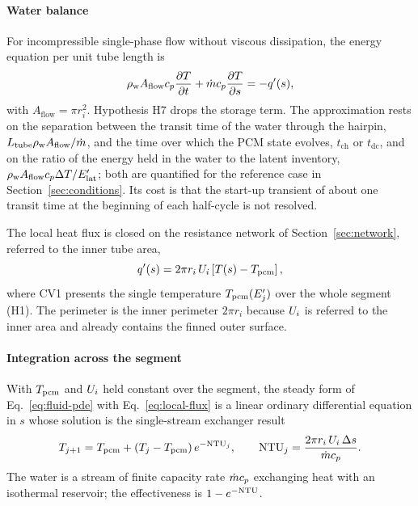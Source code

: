 \paragraph{Water balance} For incompressible single-phase flow without
viscous dissipation, the energy equation per unit tube length is
\begin{equation}
  \rho_\mathrm{w}A_\mathrm{flow}c_{p}\frac{\partial T}{\partial t}
  +\dot m c_{p}\frac{\partial T}{\partial s}=-q'(s),
  \label{eq:fluid-pde}
\end{equation}
with $A_\mathrm{flow}=\pi r_i^{2}$. Hypothesis H7 drops the storage term. The
approximation rests on the separation between the transit time of the water
through the hairpin, $L_{\mathrm{tube}}\rho_\mathrm{w}A_\mathrm{flow}/\dot m$, and the time
over which the PCM state evolves, $t_\mathrm{ch}$ or $t_\mathrm{dc}$, and on
the ratio of the energy held in the water to the latent inventory,
$\rho_\mathrm{w}A_\mathrm{flow}c_{p}\Delta T/E'_{\mathrm{lat}}$; both are quantified for
the reference case in Section~\ref{sec:conditions}. Its cost is that the
start-up transient of about one transit time at the beginning of each
half-cycle is not resolved.

The local heat flux is closed on the resistance network of
Section~\ref{sec:network}, referred to the inner tube area,
\begin{equation}
  q'(s)=2\pi r_i\,U_{i}\left[T(s)-T_{\mathrm{pcm}}\right],
  \label{eq:local-flux}
\end{equation}
where CV1 presents the single temperature $T_{\mathrm{pcm}}(E'_j)$ over the whole
segment (H1). The perimeter is the inner perimeter $2\pi r_i$ because $U_{i}$ is
referred to the inner area and already contains the finned outer surface.

\paragraph{Integration across the segment} With $T_{\mathrm{pcm}}$ and $U_{i}$ held
constant over the segment, the steady form of Eq.~\eqref{eq:fluid-pde} with
Eq.~\eqref{eq:local-flux} is a linear ordinary differential equation in $s$
whose solution is the single-stream exchanger result
\begin{equation}
  T_{j+1}=T_{\mathrm{pcm}}+\left(T_j-T_{\mathrm{pcm}}\right)e^{-\mathrm{NTU}_j},
  \qquad
  \mathrm{NTU}_j=\frac{2\pi r_i\,U_{i}\,\Delta s}{\dot m c_{p}} .
  \label{eq:ntu}
\end{equation}
The water is a stream of finite capacity rate $\dot m c_p$ exchanging heat with
an isothermal reservoir; the effectiveness is $1-e^{-\mathrm{NTU}}$.

